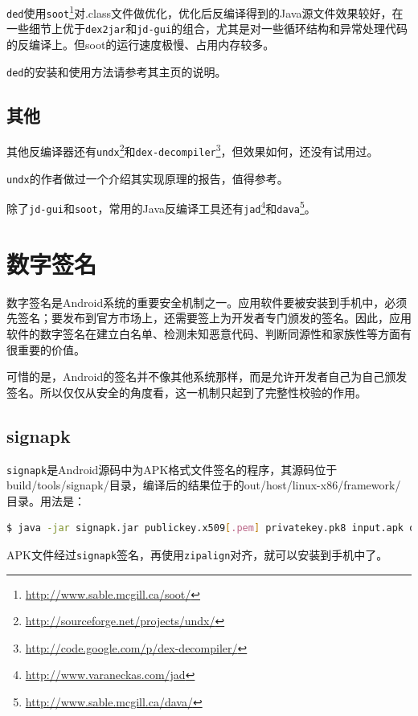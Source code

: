 \lstinline!ded!使用\lstinline!soot!\footnote{\url{http://www.sable.mcgill.ca/soot/}}对.class文件做优化，优化后反编译得到的Java源文件效果较好，在一些细节上优于\lstinline!dex2jar!和\lstinline!jd-gui!的组合，尤其是对一些循环结构和异常处理代码的反编译上。但soot的运行速度极慢、占用内存较多。

\lstinline!ded!的安装和使用方法请参考其主页的说明。

\subsection{其他}
其他反编译器还有\lstinline!undx!\footnote{\url{http://sourceforge.net/projects/undx/}}和\lstinline!dex-decompiler!\footnote{\url{http://code.google.com/p/dex-decompiler/}}，但效果如何，还没有试用过。

\lstinline!undx!的作者做过一个介绍其实现原理的报告\cite{dalvik_undx}，值得参考。

除了\lstinline!jd-gui!和\lstinline!soot!，常用的Java反编译工具还有\lstinline!jad!\footnote{\url{http://www.varaneckas.com/jad}}和\lstinline!dava!\footnote{\url{http://www.sable.mcgill.ca/dava/}}。

\section{数字签名}
数字签名是Android系统的重要安全机制之一。应用软件要被安装到手机中，必须先签名；要发布到官方市场上，还需要签上为开发者专门颁发的签名。因此，应用软件的数字签名在建立白名单、检测未知恶意代码、判断同源性和家族性等方面有很重要的价值。

可惜的是，Android的签名并不像其他系统那样，而是允许开发者自己为自己颁发签名。所以仅仅从安全的角度看，这一机制只起到了完整性校验的作用。

\subsection{signapk}
\lstinline!signapk!是Android源码中为APK格式文件签名的程序，其源码位于build/tools/signapk/目录，编译后的结果位于的out/host/linux-x86/framework/目录。用法是：
\begin{lstlisting}[language=bash, numbers=none]
 $ java -jar signapk.jar publickey.x509[.pem] privatekey.pk8 input.apk output.apk
\end{lstlisting}
APK文件经过\lstinline!signapk!签名，再使用\lstinline!zipalign!对齐，就可以安装到手机中了。

